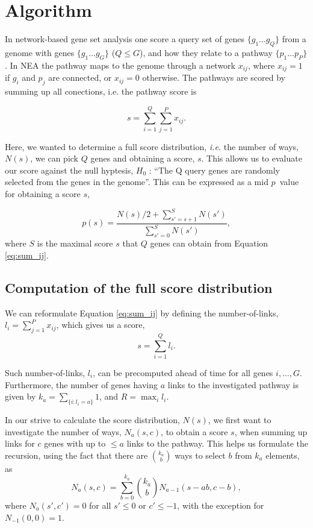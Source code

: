 \documentclass[a4paper,american]{lipics-v2016}
\begin{document}
\section*{Algorithm}


In network-based gene set analysis one score a query set of genes $ \{g_1 \ldots g_Q\} $ from a genome with genes $\{g_1 \ldots g_G\}$ ($Q \le G$), and how they relate to a pathway $\{p_1 \ldots p_P\}$. In NEA the pathway maps to the genome through a network ${x_{ij}}$, where $x_{ij}=1$ if $g_i$ and $p_j$ are connected, or $x_{ij}=0$ otherwise. The pathways are scored by summing up all conections, i.e. the pathway score is

\begin{equation}
s=\sum_{i=1}^Q\sum_{j=1}^P x_{ij}.
\label{eq:sum_ij}
\end{equation}

Here, we wanted to determine a full score distribution, {\em i.e.} the number of ways, $N(s)$, we can pick $Q$ genes and obtaining a score, $s$. This allows us to evaluate our score against the null hyptesis, $H_0$ : ``The Q query genes are randomly selected from the genes in the genome''. This can be expressed as a mid $p$~value\cite{lancaster1961significance,hwang2001optimality} for obtaining a score $s$,

\begin{equation}
p(s)=\frac{N(s)/2 +\sum_{s'=s+1}^{S} N(s')}{\sum_{s'=0}^{S} N(s')},
\label{eq:pval}
\end{equation}
where $S$ is the maximal score $s$ that $Q$ genes can obtain from Equation \ref{eq:sum_ij}.

\subsection*{Computation of the full score distribution}

We can reformulate Equation \ref{eq:sum_ij} by defining the number-of-links, $l_i=\sum_{j=1}^P x_{ij}$, which gives us a score,
\begin{equation}
s=\sum_{i=1}^Q l_i.
\label{eq:sum_i}
\end{equation}

Such number-of-links, $l_i$, can be precomputed ahead of time for all genes $i, \ldots, G$.
Furthermore, the number of genes having $a$ links to the investigated pathway is given by $k_a=\sum_{\{i:l_i=a\}}1$, and $R=\max_{i}{l_i}$.

In our strive to calculate the score distribution, $N(s)$, we first want to investigate the number of ways, $N_a(s,c)$, to obtain a score $s$, when summing up links for $c$ genes with up to $\le a$ links to the pathway. This helps us formulate the recursion, using the fact that there are $k_a \choose b$ ways to select $b$ from $k_a$ elements, as
\begin{equation}
N_a(s,c)=\sum_{b=0}^{k_a}{k_a \choose b} N_{a-1}(s-ab,c-b),
\end{equation}
where $N_a(s',c')=0$ for all $s'\le 0$ or $c' \le -1$, with the exception for $N_{-1}(0,0)=1$.
\end{document}
